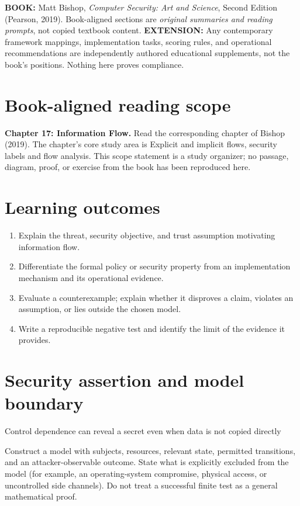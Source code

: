 \documentclass[10pt,letterpaper]{article}
\begin{document}
\makedoctocpage
\begin{notebox}
\textbf{BOOK:} Matt Bishop, \emph{Computer Security: Art and Science}, Second Edition (Pearson, 2019). Book-aligned sections are \emph{original summaries and reading prompts}, not copied textbook content.
\textbf{EXTENSION:} Any contemporary framework mappings, implementation tasks, scoring rules, and operational recommendations are independently authored educational supplements, not the book's positions. Nothing here proves compliance.
\end{notebox}
\section{Book-aligned reading scope}
\textbf{Chapter 17: Information Flow.} Read the corresponding chapter of Bishop (2019). The chapter's core study area is Explicit and implicit flows, security labels and flow analysis. This scope statement is a study organizer; no passage, diagram, proof, or exercise from the book has been reproduced here.
\section{Learning outcomes}
\begin{enumerate}
\item Explain the threat, security objective, and trust assumption motivating information flow.
\item Differentiate the formal policy or security property from an implementation mechanism and its operational evidence.
\item Evaluate a counterexample; explain whether it disproves a claim, violates an assumption, or lies outside the chosen model.
\item Write a reproducible negative test and identify the limit of the evidence it provides.
\end{enumerate}
\section{Security assertion and model boundary}
\begin{infobox}
Control dependence can reveal a secret even when data is not copied directly
\end{infobox}
Construct a model with subjects, resources, relevant state, permitted transitions, and an attacker-observable outcome. State what is explicitly excluded from the model (for example, an operating-system compromise, physical access, or uncontrolled side channels). Do not treat a successful finite test as a general mathematical proof.
\end{document}
